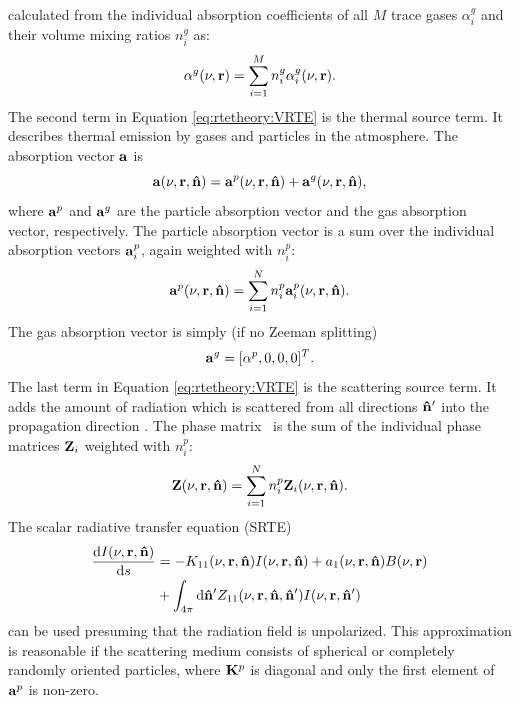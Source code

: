 calculated from the individual absorption coefficients of all $M$
trace gases $\alpha_i^g$ and their volume mixing ratios
$n^g_i$ as:
\begin{equation}
   \alpha^g(\nu,{\bf r}) =  \sum_{i=1}^M  n^g_i \alpha_i^g(\nu,{\bf r}).
\end{equation}
The second term in Equation \ref{eq:rtetheory:VRTE} is the thermal source term.
It describes thermal emission by gases and particles in the atmosphere. The
absorption vector ${\bf a}$ is
\begin{equation}
  {\bf a}(\nu,{\bf r},{\bf \hat{n}})  =
  {\bf a}^{p}(\nu,{\bf r},{\bf \hat{n}}) +
  {\bf a}^{g}(\nu,{\bf r},{\bf \hat{n}}),
\end{equation}
where ${\bf a}^{p}$ and ${\bf a}^{g}$
are the particle absorption vector and the gas absorption vector,
respectively.  The particle absorption vector is a sum over the
individual absorption vectors ${\bf a}_i^p$, again
weighted with $n^p_i$:
\begin{equation}
  {\bf a}^{p}(\nu,{\bf r},{\bf \hat{n}}) = \sum_{i=1}^N n^p_i {\bf a}_i^p(\nu,{\bf r},{\bf \hat{n}}).
\label{eq:rtetheory:abs_vec_p}
\end{equation}
The gas absorption vector is simply (if no Zeeman splitting)
\begin{equation}
 {\bf a}^{g}  = [\alpha^p, 0, 0, 0]^T.
\end{equation}
The last term in Equation \ref{eq:rtetheory:VRTE} is the scattering source
term. It adds the amount of radiation which is scattered from all directions
${\bf \hat{n}}'$ into the propagation direction \PDir. The phase matrix \PhaMat\
is the sum of the individual phase matrices ${\bf Z}_i$ weighted with
$n^p_i$:
\begin{equation}
  {\bf Z}(\nu,{\bf r},{\bf \hat{n}}) = 
  \sum_{i=1}^N n^p_i {\bf Z}_i(\nu,{\bf r},{\bf \hat{n}}).
  \label{eq:rtetheory:pha_mat}
\end{equation}
The scalar radiative transfer equation (SRTE)
\begin{eqnarray}
  \label{eq:rtetheory:SRTE}
  \frac{\mathrm{d} I(\nu,{\bf r},{\bf \hat{n}})}{\mathrm{d} s}& = 
  -K_{11}(\nu,{\bf r},{\bf \hat{n}}) I(\nu,{\bf r},{\bf \hat{n}}) +
  a_1(\nu,{\bf r},{\bf \hat{n}}) B(\nu,{\bf r})   \nonumber\\
  &+\int_{4\pi} \mathrm{d} {\bf \hat{n}}' Z_{11}(\nu,{\bf r},{\bf \hat{n}},{\bf \hat{n}}') I(\nu,{\bf r},{\bf \hat{n}}')
\end{eqnarray}
can be used presuming that the radiation field is unpolarized. This
approximation is reasonable if the scattering medium consists of spherical or
completely randomly oriented particles, where ${\bf K}^p$ is diagonal and only
the first element of ${\bf a}^p$ is non-zero.


